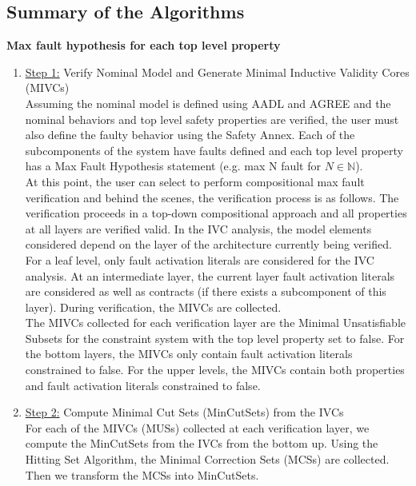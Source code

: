 \subsection{Summary of the Algorithms}

\textbf{Max fault hypothesis for each top level property}
\begin{enumerate}[label=(\roman*)]
\item \underline{Step 1:} Verify Nominal Model and Generate Minimal Inductive Validity Cores (MIVCs) \\

Assuming the nominal model is defined using AADL and AGREE and the nominal behaviors and top level safety properties are verified, the user must also define the faulty behavior using the Safety Annex. Each of the subcomponents of the system have faults defined and each top level property has a Max Fault Hypothesis statement (e.g. max N fault for $N \in \mathbb{N}$). \\

At this point, the user can select to perform compositional max fault verification and behind the scenes, the verification process is as follows. The verification proceeds in a top-down compositional approach and all properties at all layers are verified valid. In the IVC analysis, the model elements considered depend on the layer of the architecture currently being verified. For a leaf level, only fault activation literals are considered for the IVC analysis. At an intermediate layer, the current layer fault activation literals are considered as well as contracts (if there exists a subcomponent of this layer). During verification, the MIVCs are collected.  \\

The MIVCs collected for each verification layer are the Minimal Unsatisfiable Subsets for the constraint system with the top level property set to false. For the bottom layers, the MIVCs only contain fault activation literals constrained to false. For the upper levels, the MIVCs contain both properties and fault activation literals constrained to false. \\

\item \underline{Step 2:} Compute Minimal Cut Sets (MinCutSets) from the IVCs \\

For each of the MIVCs (MUSs) collected at each verification layer, we compute the MinCutSets from the IVCs from the bottom up. Using the Hitting Set Algorithm, the Minimal Correction Sets (MCSs) are collected. Then we transform the MCSs into MinCutSets.  \\


\end{enumerate}
